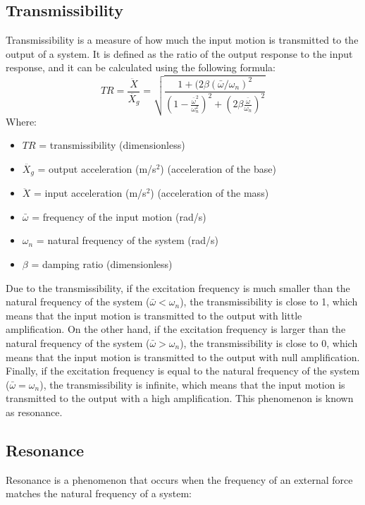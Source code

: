 \documentclass{article}  %
\begin{document}
\subsection{Transmissibility}
Transmissibility is a measure of how much the input motion is transmitted to the output of a system. It is defined as the ratio of the output response to the input response, and it can be calculated using the following formula:
\begin{equation}
TR = \frac{\ddot{X}}{\ddot{X_g}} = \sqrt{\frac{1+(2 \beta (\bar{\omega}/\omega_n)^2}{(1 - \frac{\bar{\omega}^2}{\omega_n^2})^2 + (2\beta\frac{\bar{\omega}}{\omega_n})^2}} 
\label{eq:transmissibility}
\end{equation}
Where:
\begin{itemize}
  \item $TR$ = transmissibility (dimensionless)
  \item $\ddot{X_g}$ = output acceleration (m/s$^2$) (acceleration of the base) 
  \item $\ddot{X}$ = input acceleration (m/s$^2$) (acceleration of the mass)
  \item $\bar{\omega}$ = frequency of the input motion (rad/s)
  \item $\omega_n$ = natural frequency of the system (rad/s)
  \item $\beta$ = damping ratio (dimensionless)
\end{itemize}

Due to the transmissibility, if the excitation frequency is much smaller than the natural frequency of the system ($\bar{\omega} < \omega_n$), the transmissibility is close to 1, which means that the input motion is transmitted to the output with little amplification. On the other hand, if the excitation frequency is larger than the natural frequency of the system ($\bar{\omega} > \omega_n$), the transmissibility is close to 0, which means that the input motion is transmitted to the output with null amplification. Finally, if the excitation frequency is equal to the natural frequency of the system ($\bar{\omega} = \omega_n$), the transmissibility is infinite, which means that the input motion is transmitted to the output with a high amplification. This phenomenon is known as resonance.

\subsection{Resonance}
Resonance is a phenomenon that occurs when the frequency of an external force matches the natural frequency of a system:
\end{document}
